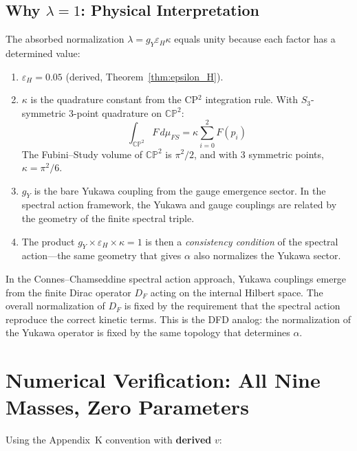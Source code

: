 \documentclass[11pt,a4paper]{article}
\newcommand{\CP}{\mathbb{CP}}
\theoremstyle{definition}
\theoremstyle{remark}
\begin{document}
\subsection{Why $\lambda = 1$: Physical Interpretation}

The absorbed normalization $\lambda = g_Y\varepsilon_H\kappa$ equals unity
because each factor has a determined value:

\begin{enumerate}
\item $\varepsilon_H = 0.05$ (derived, Theorem~\ref{thm:epsilon_H}).

\item $\kappa$ is the quadrature constant from the CP$^2$ integration rule.
  With $S_3$-symmetric 3-point quadrature on $\CP^2$:
  \[
  \int_{\CP^2} F\,d\mu_{FS} = \kappa\sum_{i=0}^{2}F(p_i)
  \]
  The Fubini--Study volume of $\CP^2$ is $\pi^2/2$, and with 3 symmetric
  points, $\kappa = \pi^2/6$.

\item $g_Y$ is the bare Yukawa coupling from the gauge emergence sector.
  In the spectral action framework, the Yukawa and gauge couplings are
  related by the geometry of the finite spectral triple.

\item The product $g_Y \times \varepsilon_H \times \kappa = 1$ is then a
  \emph{consistency condition} of the spectral action---the same geometry
  that gives $\alpha$ also normalizes the Yukawa sector.
\end{enumerate}

In the Connes--Chamseddine spectral action approach, Yukawa couplings
emerge from the finite Dirac operator $D_F$ acting on the internal Hilbert
space. The overall normalization of $D_F$ is fixed by the requirement that
the spectral action reproduce the correct kinetic terms. This is the
DFD analog: the normalization of the Yukawa operator is fixed by the
same topology that determines $\alpha$.

\section{Numerical Verification: All Nine Masses, Zero Parameters}
\label{sec:numerical}

Using the Appendix~K convention with \textbf{derived} $v$:
\end{document}
